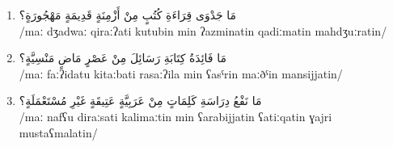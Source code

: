 \documentclass[letterpaper,12pt]{article}
\begin{document}
\begin{enumerate}
\item \textarabic{مَا جَدْوَى قِرَاءَةِ كُتُبٍ مِنْ أَزْمِنَةٍ قَدِيمَةٍ مَهْجُورَةٍ؟}\\
/maː dʒadwaː qiraːʔati kutubin min ʔazminatin qadiːmatin mahdʒuːratin/

\item \textarabic{مَا فَائِدَةُ كِتَابَةِ رَسَائِلَ مِنْ عَصْرٍ مَاضٍ مَنْسِيَّةٍ؟}\\
/maː faːʔidatu kitaːbati rasaːʔila min ʕasˤrin maːðˤin mansijjatin/

\item \textarabic{مَا نَفْعُ دِرَاسَةِ كَلِمَاتٍ مِنْ عَرَبِيَّةٍ عَتِيقَةٍ غَيْرِ مُسْتَعْمَلَةٍ؟}\\
/maː nafʕu diraːsati kalimaːtin min ʕarabijjatin ʕatiːqatin ɣajri mustaʕmalatin/
\end{enumerate}
\end{document}
